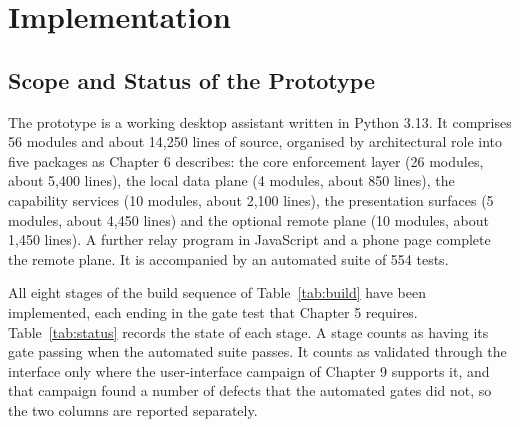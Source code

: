 \documentclass{FastFyp}
\begin{document}
\section{Implementation}
\subsection{Scope and Status of the Prototype}
The prototype is a working desktop assistant written in Python 3.13. It comprises 56 modules and about 14,250 lines of source, organised by architectural role into five packages as Chapter 6 describes: the core enforcement layer (26 modules, about 5,400 lines), the local data plane (4 modules, about 850 lines), the capability services (10 modules, about 2,100 lines), the presentation surfaces (5 modules, about 4,450 lines) and the optional remote plane (10 modules, about 1,450 lines). A further relay program in JavaScript and a phone page complete the remote plane. It is accompanied by an automated suite of 554 tests.

All eight stages of the build sequence of Table~\ref{tab:build} have been implemented, each ending in the gate test that Chapter 5 requires. Table~\ref{tab:status} records the state of each stage. A stage counts as having its gate passing when the automated suite passes. It counts as validated through the interface only where the user-interface campaign of Chapter 9 supports it, and that campaign found a number of defects that the automated gates did not, so the two columns are reported separately.
\end{document}
